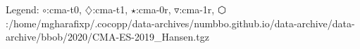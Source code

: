 Legend: {\color{NavyBlue}$\circ$}:cma-t0, {\color{Magenta}$\diamondsuit$}:cma-t1, {\color{Orange}$\star$}:cma-0r, {\color{CornflowerBlue}$\triangledown$}:cma-1r, {\color{red}$\varhexagon$}:/home/mgharafixp/.cocopp/data-archives/numbbo.github.io/data-archive/data-archive/bbob/2020/CMA-ES-2019\_Hansen.tgz